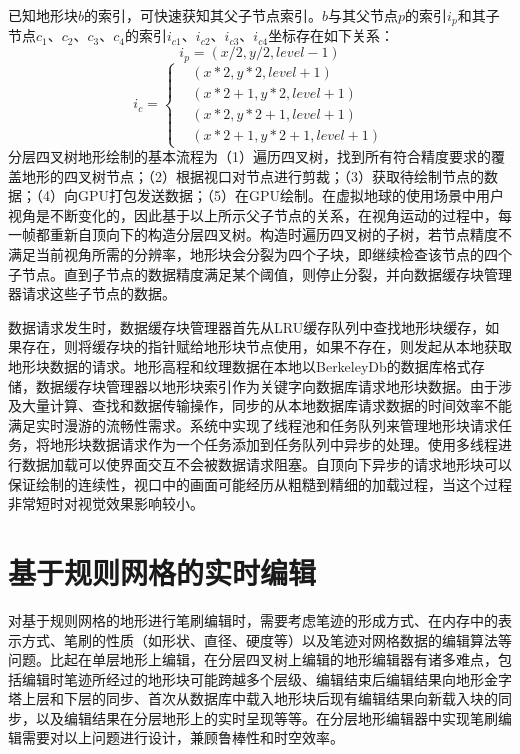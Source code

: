 已知地形块$b$的索引，可快速获知其父子节点索引。$b$与其父节点$p$的索引$i_p$和其子节点$c_1$、$c_2$、$c_3$、$c_4$的索引$i_{c1}$、$i_{c2}$、$i_{c3}$、$i_{c4}$坐标存在如下关系：
\begin{equation}
i_p = (x/2,y/2,level-1)
\end{equation}
\begin{equation}
i_c = \left\{ \begin{aligned}
&(x*2,y*2,level+1)\\
&(x*2+1,y*2,level+1)\\
&(x*2,y*2+1,level+1)\\
&(x*2+1,y*2+1,level+1)
\end{aligned} \right.
\end{equation}
分层四叉树地形绘制的基本流程为（1）遍历四叉树，找到所有符合精度要求的覆盖地形的四叉树节点；（2）根据视口对节点进行剪裁；（3）获取待绘制节点的数据；（4）向GPU打包发送数据；（5）在GPU绘制。在虚拟地球的使用场景中用户视角是不断变化的，因此基于以上所示父子节点的关系，在视角运动的过程中，每一帧都重新自顶向下的构造分层四叉树。构造时遍历四叉树的子树，若节点精度不满足当前视角所需的分辨率，地形块会分裂为四个子块，即继续检查该节点的四个子节点。直到子节点的数据精度满足某个阈值，则停止分裂，并向数据缓存块管理器请求这些子节点的数据。\par
数据请求发生时，数据缓存块管理器首先从LRU缓存队列中查找地形块缓存，如果存在，则将缓存块的指针赋给地形块节点使用，如果不存在，则发起从本地获取地形块数据的请求。地形高程和纹理数据在本地以BerkeleyDb\supercite{Db}的数据库格式存储，数据缓存块管理器以地形块索引作为关键字向数据库请求地形块数据。由于涉及大量计算、查找和数据传输操作，同步的从本地数据库请求数据的时间效率不能满足实时漫游的流畅性需求。系统中实现了线程池和任务队列来管理地形块请求任务，将地形块数据请求作为一个任务添加到任务队列中异步的处理。使用多线程进行数据加载可以使界面交互不会被数据请求阻塞。自顶向下异步的请求地形块可以保证绘制的连续性，视口中的画面可能经历从粗糙到精细的加载过程，当这个过程非常短时对视觉效果影响较小。
\par

\section{基于规则网格的实时编辑}
对基于规则网格的地形进行笔刷编辑时，需要考虑笔迹的形成方式、在内存中的表示方式、笔刷的性质（如形状、直径、硬度等）以及笔迹对网格数据的编辑算法等问题。比起在单层地形上编辑，在分层四叉树上编辑的地形编辑器有诸多难点，包括编辑时笔迹所经过的地形块可能跨越多个层级、编辑结束后编辑结果向地形金字塔上层和下层的同步、首次从数据库中载入地形块后现有编辑结果向新载入块的同步，以及编辑结果在分层地形上的实时呈现等等。在分层地形编辑器中实现笔刷编辑需要对以上问题进行设计，兼顾鲁棒性和时空效率。\par

